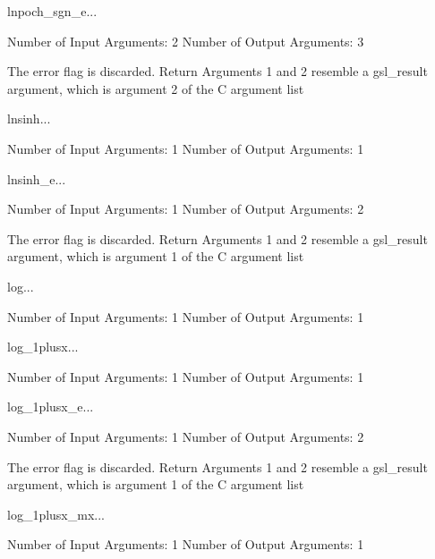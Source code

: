 \begin{funcdesc}{lnpoch_sgn_e}{...}

    Number of Input  Arguments:  2
    Number of Output Arguments:  3

The error flag is discarded.
Return Arguments 1 and 2 resemble a gsl_result argument,
	which is  argument 2 of the C argument list

\end{funcdesc}

\begin{funcdesc}{lnsinh}{...}

    Number of Input  Arguments:  1
    Number of Output Arguments:  1
\end{funcdesc}

\begin{funcdesc}{lnsinh_e}{...}

    Number of Input  Arguments:  1
    Number of Output Arguments:  2

The error flag is discarded.
Return Arguments 1 and 2 resemble a gsl_result argument,
	which is  argument 1 of the C argument list

\end{funcdesc}

\begin{funcdesc}{log}{...}

    Number of Input  Arguments:  1
    Number of Output Arguments:  1
\end{funcdesc}

\begin{funcdesc}{log_1plusx}{...}

    Number of Input  Arguments:  1
    Number of Output Arguments:  1
\end{funcdesc}

\begin{funcdesc}{log_1plusx_e}{...}

    Number of Input  Arguments:  1
    Number of Output Arguments:  2

The error flag is discarded.
Return Arguments 1 and 2 resemble a gsl_result argument,
	which is  argument 1 of the C argument list

\end{funcdesc}

\begin{funcdesc}{log_1plusx_mx}{...}

    Number of Input  Arguments:  1
    Number of Output Arguments:  1
\end{funcdesc}

